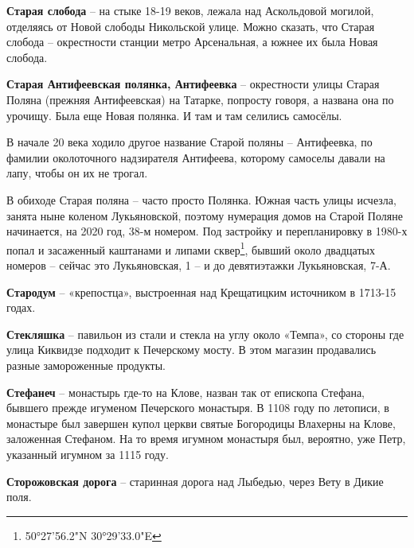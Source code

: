 \textbf{Старая слобода} – на стыке 18-19 веков, лежала над Аскольдовой могилой, отделяясь от Новой слободы Никольской улице. Можно сказать, что Старая слобода – окрестности станции метро Арсенальная, а южнее их была Новая слобода.\\

\medskip

\textbf{Старая Антифеевская полянка, Антифеевка} – окрестности улицы Старая Поляна (прежняя Антифеевская) на Татарке, попросту говоря, а названа она по урочищу. Была еще Новая полянка. И там и там селились самосёлы. 

В начале 20 века ходило другое название Старой поляны – Антифеевка, по фамилии околоточного надзирателя Антифеева, которому самоселы давали на лапу, чтобы он их не трогал. 

В обиходе Старая поляна – часто просто Полянка. Южная часть улицы исчезла, занята ныне коленом Лукьяновской, поэтому нумерация домов на Старой Поляне начинается, на 2020 год, 38-м номером. Под застройку и перепланировку в 1980-х попал и засаженный каштанами и липами сквер\footnote{50°27'56.2"N 30°29'33.0"E}, бывший около двадцатых номеров – сейчас это Лукьяновская, 1 – и до девятиэтажки Лукьяновская, 7-А.\\

\medskip

\textbf{Стародум} – «крепостца», выстроенная  над Крещатицким источником в 1713-15 годах.\\

\medskip

\textbf{Стекляшка} – павильон из стали и стекла на углу около «Темпа», со стороны где улица Киквидзе подходит к Печерскому мосту. В этом магазин продавались разные замороженные продукты.\\

\medskip

\textbf{Стефанеч} – монастырь где-то на Клове, назван так от епископа Стефана, бывшего прежде игуменом Печерского монастыря. В 1108 году по летописи, в монастыре был завершен купол церкви святые Богородицы Влахерны на Клове, заложенная Стефаном. На то время игумном монастыря был, вероятно, уже Петр, указанный игумном за 1115 году.\\

\medskip

\textbf{Сторожовская дорога} – старинная дорога над Лыбедью, через Вету в Дикие поля.\\

\medskip


